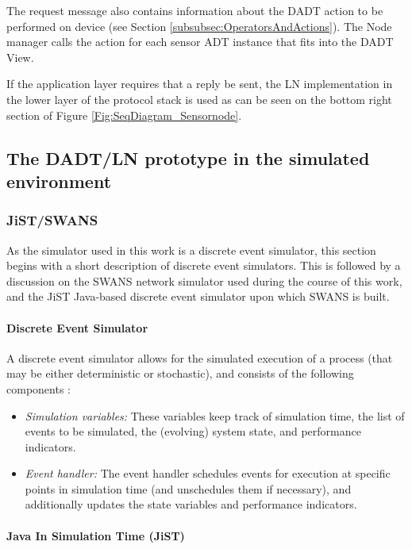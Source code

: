 The request message also contains information about the DADT action to be
performed on device (see Section \ref{subsubsec:OperatorsAndActions}). 
The Node manager calls the action for each sensor ADT instance that fits into the DADT View. 

If the application layer requires that a reply be sent, the LN implementation in
the lower layer of the protocol stack is used as can be seen on the bottom
right section of Figure \ref{Fig:SeqDiagram_Sensornode}.


\subsection{The DADT/LN prototype in the simulated environment}
\subsubsection {JiST/SWANS} \label{sec:jistswans}

As the simulator used in this work is a discrete event simulator, this section
begins with a short description of discrete event simulators. This is followed by
a discussion on the SWANS network simulator used during the course of this work,
and the JiST Java-based discrete event simulator upon which SWANS is built.

\paragraph{Discrete Event Simulator}

A discrete event simulator allows for the simulated execution of a process (that
may be either deterministic or stochastic), and consists of the following
components \cite{Shankar_DiscreteEventSim}:

\begin{itemize}
  \item \emph{Simulation variables:} These variables keep track of simulation 
  time, the list of events to be simulated, the (evolving) system state, and 
  performance indicators.
  \item \emph{Event handler:} The event handler schedules events for execution 
  at specific points in simulation time (and unschedules them if necessary), 
  and additionally updates the state variables and performance indicators.
\end{itemize}
 
\paragraph{Java In Simulation Time (JiST)} \label{subsec:jist}

